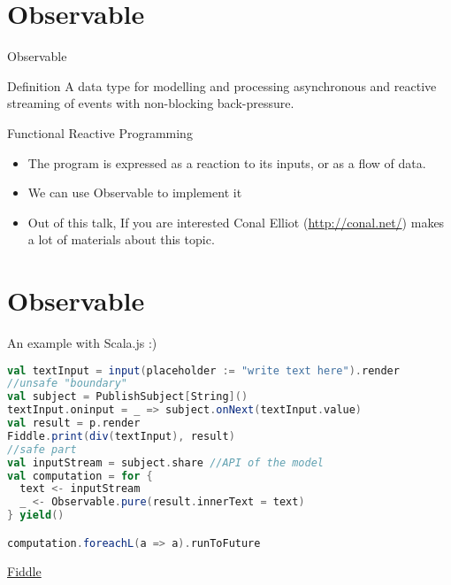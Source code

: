 \documentclass[presentation]{beamer}
\let\oldcite\cite
\renewcommand{\cite}[1]{{\color{blue}\oldcite{#1}}}
\begin{document}
\section{Observable}
\begin{frame}[fragile]{Observable}

\begin{block}{Definition}
A data type for modelling and processing asynchronous and reactive streaming of events with non-blocking back-pressure.
\end{block}

\begin{block}{Functional Reactive Programming \cite{wiki:functional} \cite{blackheath2016functional}}
  \begin{itemize}
    \item The program is expressed as a reaction to its inputs, or as a flow of data.
    \item We can use Observable to implement it
    \item Out of this talk, If you are interested Conal Elliot (\url{http://conal.net/}) makes a lot of materials about this topic.
  \end{itemize}
\end{block}

\end{frame}

\section{Observable}
\begin{frame}[fragile]{An example with Scala.js :)}
\begin{lstlisting}[language=Scala]
val textInput = input(placeholder := "write text here").render
//unsafe "boundary"
val subject = PublishSubject[String]() 
textInput.oninput = _ => subject.onNext(textInput.value)
val result = p.render
Fiddle.print(div(textInput), result)
//safe part
val inputStream = subject.share //API of the model
val computation = for {
  text <- inputStream
  _ <- Observable.pure(result.innerText = text)
} yield()

computation.foreachL(a => a).runToFuture
\end{lstlisting}  
\begin{center}
  \href{https://scalafiddle.io/sf/0uDr1Cr/1}{Fiddle}
\end{center}

\end{frame}
\end{document}
